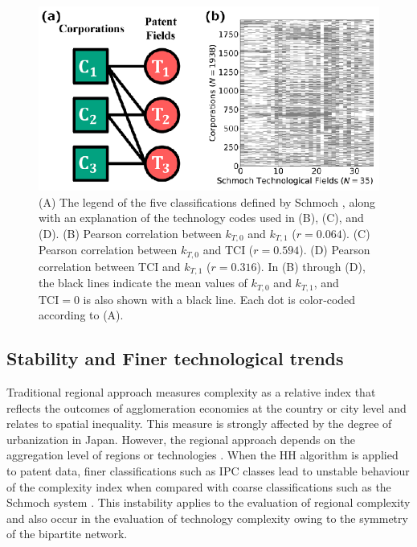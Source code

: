 \documentclass[fleqn,10pt]{wlscirep}
\begin{document}
\begin{figure}[ht]
    \centering
    \includegraphics[scale=1.00]{Figs/Fig1.eps}
    \caption{(A) The legend of the five classifications defined by Schmoch \cite{Schmoch2008}, along with an explanation of the technology codes used in (B), (C), and (D).
    (B) Pearson correlation between \(k_{T,0}\) and \(k_{T,1}\) (\(r=0.064\)).
    (C) Pearson correlation between \(k_{T,0}\) and TCI (\(r=0.594\)).
    (D) Pearson correlation between TCI and \(k_{T,1}\) (\(r=0.316\)).
    In (B) through (D), the black lines indicate the mean values of \(k_{T,0}\) and \(k_{T,1}\), and \(\text{TCI} = 0\) is also shown with a black line. Each dot is color‐coded according to (A).
    }
    \label{fig:scatter}
\end{figure}

\subsection*{Stability and Finer technological trends}

Traditional regional approach measures complexity as a relative index that reflects the outcomes of agglomeration economies at the country or city level \cite{hartmann2024economic} and relates to spatial inequality. 
This measure is strongly affected by the degree of urbanization in Japan. 
However, the regional approach depends on the aggregation level of regions or technologies \cite{Hidalgo2021}. 
When the HH algorithm is applied to patent data, finer classifications such as IPC classes lead to unstable behaviour of the complexity index when compared with coarse classifications such as the Schmoch system \cite{PintarEssletzbichler2022}. 
This instability applies to the evaluation of regional complexity and also occur in the evaluation of technology complexity owing to the symmetry of the bipartite network.
\end{document}
